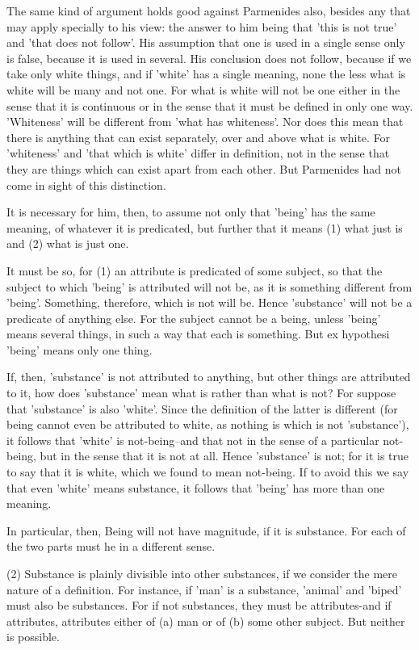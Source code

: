 The same kind of argument holds good against Parmenides also, besides
any that may apply specially to his view: the answer to him being
that 'this is not true' and 'that does not follow'. His assumption
that one is used in a single sense only is false, because it is used
in several. His conclusion does not follow, because if we take only
white things, and if 'white' has a single meaning, none the less what
is white will be many and not one. For what is white will not be one
either in the sense that it is continuous or in the sense that it
must be defined in only one way. 'Whiteness' will be different from
'what has whiteness'. Nor does this mean that there is anything that
can exist separately, over and above what is white. For 'whiteness'
and 'that which is white' differ in definition, not in the sense that
they are things which can exist apart from each other. But Parmenides
had not come in sight of this distinction. 

It is necessary for him, then, to assume not only that 'being' has
the same meaning, of whatever it is predicated, but further that it
means (1) what just is and (2) what is just one. 

It must be so, for (1) an attribute is predicated of some subject,
so that the subject to which 'being' is attributed will not be, as
it is something different from 'being'. Something, therefore, which
is not will be. Hence 'substance' will not be a predicate of anything
else. For the subject cannot be a being, unless 'being' means several
things, in such a way that each is something. But ex hypothesi 'being'
means only one thing. 

If, then, 'substance' is not attributed to anything, but other things
are attributed to it, how does 'substance' mean what is rather than
what is not? For suppose that 'substance' is also 'white'. Since the
definition of the latter is different (for being cannot even be attributed
to white, as nothing is which is not 'substance'), it follows that
'white' is not-being--and that not in the sense of a particular not-being,
but in the sense that it is not at all. Hence 'substance' is not;
for it is true to say that it is white, which we found to mean not-being.
If to avoid this we say that even 'white' means substance, it follows
that 'being' has more than one meaning. 

In particular, then, Being will not have magnitude, if it is substance.
For each of the two parts must he in a different sense. 

(2) Substance is plainly divisible into other substances, if we consider
the mere nature of a definition. For instance, if 'man' is a substance,
'animal' and 'biped' must also be substances. For if not substances,
they must be attributes-and if attributes, attributes either of (a)
man or of (b) some other subject. But neither is possible.

